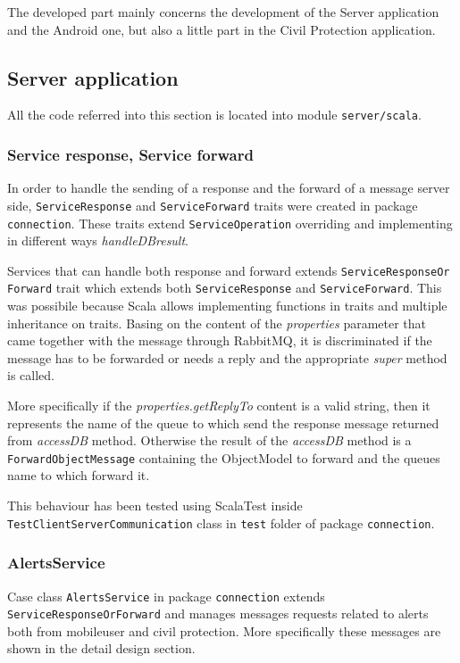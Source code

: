 \documentclass[a4paper,12pt]{report}
\begin{document}
The developed part mainly concerns the development of the Server application and the Android one, but also  a little part in the Civil Protection application.

\subsection{Server application}

All the code referred into this section is located into module \texttt{server/scala}.

\subsubsection{Service response, Service forward}
In order to handle the sending of a response and the forward of a message server side, \texttt{ServiceResponse} and \texttt{ServiceForward} traits were created in package \texttt{connection}. These traits extend \texttt{ServiceOperation} overriding and implementing in different ways \textit{handleDBresult}. 

Services that can handle both response and forward extends \texttt{ServiceResponseOr\\Forward} trait which extends both \texttt{ServiceResponse} and \texttt{ServiceForward}. This was possibile because Scala allows implementing functions in traits and multiple inheritance on traits. Basing on the content of the \textit{properties} parameter that came together with the message through RabbitMQ, it is discriminated if the message has to be forwarded or needs a reply and the appropriate \textit{super} method is called.

More specifically if the \textit{properties.getReplyTo} content is a valid string, then it represents the name of the queue to which send the response message returned from \textit{accessDB} method. Otherwise the result of the \textit{accessDB} method is a \texttt{ForwardObjectMessage} containing the ObjectModel to forward and the queues name to which forward it.

This behaviour has been tested using ScalaTest inside \texttt{TestClientServerCommunication} class in \texttt{test} folder of package \texttt{connection}.

\subsubsection{AlertsService}
Case class \texttt{AlertsService} in package \texttt{connection} extends \texttt{ServiceResponseOrForward} and manages messages requests related to alerts both from mobileuser and civil protection. More specifically these messages are shown in the detail design section.
\end{document}
